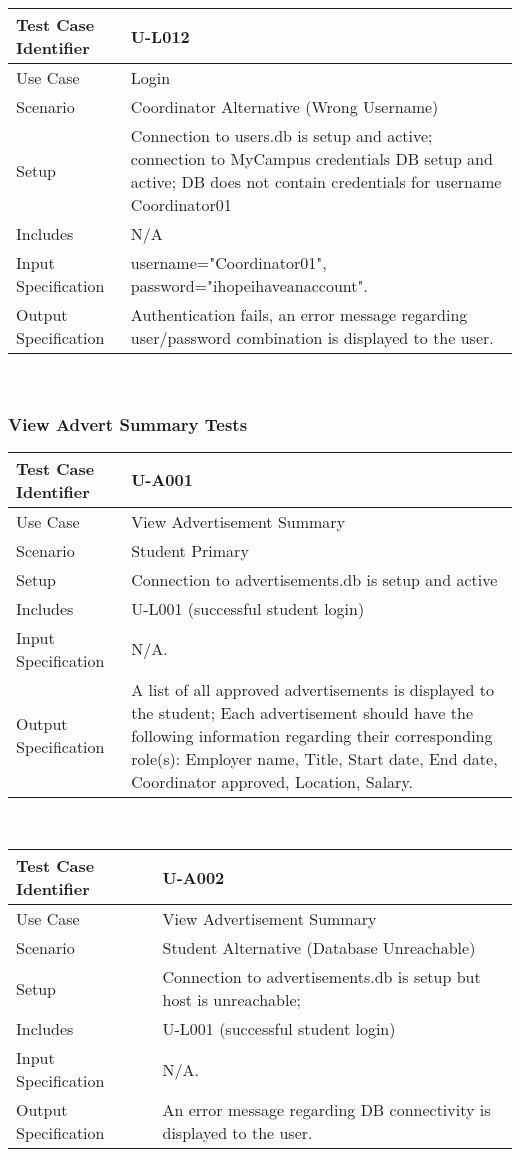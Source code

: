 \documentclass{l3deliverable}
\begin{document}
\begin{tabular}{lp{10cm}}
\hline 
\textbf{Test Case Identifier} & U-L012\tabularnewline
\hline 
\hline 
Use Case & Login \tabularnewline
\hline 
Scenario & Coordinator Alternative (Wrong Username) \tabularnewline
\hline 
Setup & Connection to users.db is setup and active; connection to MyCampus credentials DB setup and active; DB does not contain credentials for username Coordinator01 \tabularnewline
\hline 
Includes & N/A \tabularnewline
\hline 
Input Specification & username="Coordinator01", password="ihopeihaveanaccount".\tabularnewline
\hline 
Output Specification & Authentication fails, an error message regarding user/password combination is displayed to the user.\tabularnewline
\hline 
\end{tabular}\\

\subsubsection{View Advert Summary Tests}

\begin{tabular}{lp{10cm}}
\hline 
\textbf{Test Case Identifier} & U-A001\tabularnewline
\hline 
\hline 
Use Case & View Advertisement Summary \tabularnewline
\hline 
Scenario & Student Primary \tabularnewline
\hline 
Setup & Connection to advertisements.db is setup and active \tabularnewline
\hline 
Includes &  U-L001 (successful student login) \tabularnewline
\hline 
Input Specification & N/A.\tabularnewline
\hline 
Output Specification &  A list of all approved advertisements is displayed to the student; Each advertisement should have the following information regarding their corresponding role(s): Employer name, Title, Start date, End date, Coordinator approved, Location, Salary.\tabularnewline
\hline 
\end{tabular}\\

\begin{tabular}{lp{10cm}}
\hline 
\textbf{Test Case Identifier} & U-A002\tabularnewline
\hline 
\hline 
Use Case & View Advertisement Summary \tabularnewline
\hline 
Scenario & Student Alternative (Database Unreachable) \tabularnewline
\hline 
Setup & Connection to advertisements.db is setup but host is unreachable; \tabularnewline
\hline 
Includes &  U-L001 (successful student login) \tabularnewline
\hline 
Input Specification & N/A.\tabularnewline
\hline 
Output Specification & An error message regarding DB connectivity is displayed to the user.\tabularnewline
\hline 
\end{tabular}\\
\end{document}
